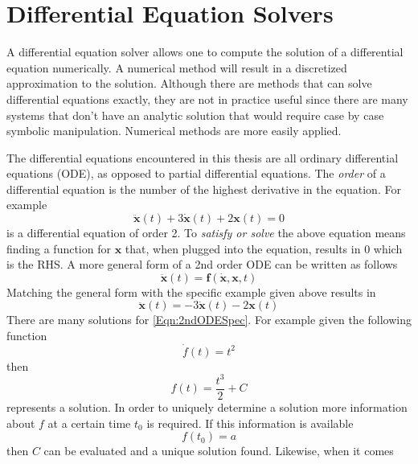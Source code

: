 \chapter{Differential Equation Solvers}
\label{Cha:DESolvers}
A differential equation solver allows one to compute the solution of a
differential equation numerically. A numerical method will result in a
discretized approximation to the solution. Although there are methods that can
solve differential equations exactly, they are not in practice useful since
there are many systems that don't have an analytic solution that
would require case by case symbolic manipulation. Numerical methods are more
easily applied.

The differential equations encountered in this thesis are all ordinary
differential equations (ODE), as opposed to partial differential equations. The
\textit{order} of a differential equation is the number of the highest
derivative in the equation. For example
\begin{equation}
    \label{Eqn:2ndODESpec}
	\mathbf{\ddot{x}}(t) + 3\mathbf{\dot{x}}(t) + 2\mathbf{x}(t) = 0
\end{equation}
is a differential equation of order 2. To \textit{satisfy or solve} the above
equation means finding a function for $\mathbf{x}$ that, when plugged into the
equation, results in $0$ which is the RHS. A more general form of a 2nd order ODE can
be written as follows
\begin{equation}
    \label{Eqn:2ndODE1}
    \mathbf{\ddot{x}}(t) = \mathbf{f}(\mathbf{\dot{x}}, \mathbf{x}, t)  
\end{equation}
Matching the general form with the specific example given above results in 
\begin{equation}
    \label{Eqn:2ndODESpec1}
    \mathbf{\ddot{x}}(t) = -3\mathbf{\dot{x}}(t) -2\mathbf{x}(t)
\end{equation}
There are many solutions for \ref{Eqn:2ndODESpec}.
For example given the following function
\begin{equation}
    \label{Eqn:Example}
    \dot{f}(t) = t^2
\end{equation}
then
\begin{equation}
    \label{Eqn:Example1}
    f(t) = \frac{t^3}{2} + C
\end{equation}
represents a solution.
In order to uniquely determine a solution more information about $f$ at a
certain time $t_0$ is required. If this information is available
\[
    f(t_0) = a
\] 
then $C$ can be evaluated and a unique solution found. Likewise, when it comes
